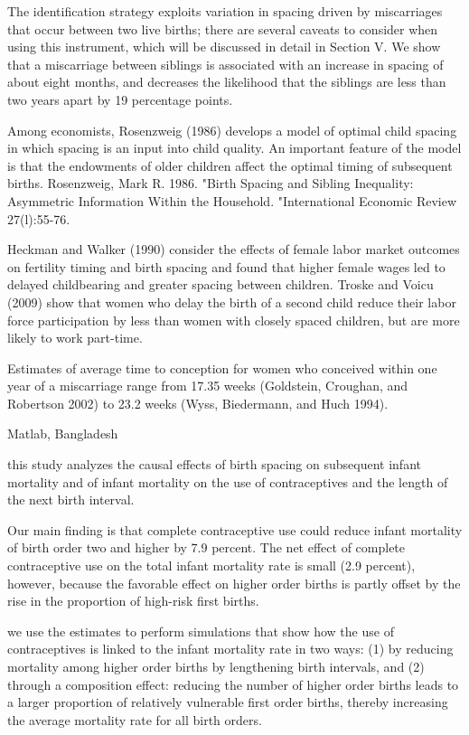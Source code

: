 The identification strategy exploits variation in spacing driven by 
miscarriages that occur between two live births; there are several
caveats to 
consider when using this instrument, which will be discussed in detail
in Section V. 
We show that a miscarriage between siblings is associated with an
increase in 
spacing of about eight months, and decreases the likelihood that the
siblings 
are less than two years apart by 19 percentage points.

Among economists, Rosenzweig (1986) develops a model of optimal child
spacing
in which spacing is an input into child quality. An important feature of
the model
is that the endowments of older children affect the optimal timing of
subsequent
births.
Rosenzweig, Mark R. 1986. "Birth Spacing and Sibling Inequality:
Asymmetric Information
Within the Household. "International Economic Review 27(l):55-76. 

Heckman and Walker (1990) consider the effects of female labor market
outcomes
on fertility timing and birth spacing and found that higher female wages
led to
delayed childbearing and greater spacing between children. Troske and
Voicu (2009)
show that women who delay the birth of a second child reduce their labor
force
participation by less than women with closely spaced children, but are
more likely
to work part-time.

Estimates of average time to conception for women who conceived within
one year of 
a miscarriage range from 17.35 weeks (Goldstein, Croughan, and Robertson
2002) to 23.2
weeks (Wyss, Biedermann, and Huch 1994).

\citet{Saha2013}

Matlab, Bangladesh

this study analyzes the causal effects of birth spacing on subsequent
infant mortality and of infant mortality on the use of contraceptives
and the length of the next birth interval.

Our main finding is that complete contraceptive use could reduce infant
mortality of birth order two and higher by 7.9 percent. The net effect
of complete contraceptive use on the total infant mortality rate is
small (2.9 percent), however, because the favorable effect on higher
order births is partly offset by the rise in the proportion of high-risk
first births.

we use the estimates to perform simulations that show how the use of
contraceptives is linked to the infant mortality rate in two ways: (1)
by reducing mortality among higher order births by lengthening birth
intervals, and (2) through a composition effect: reducing the number of
higher order births leads to a larger proportion of relatively
vulnerable first order births, thereby increasing the average mortality
rate for all birth orders.

